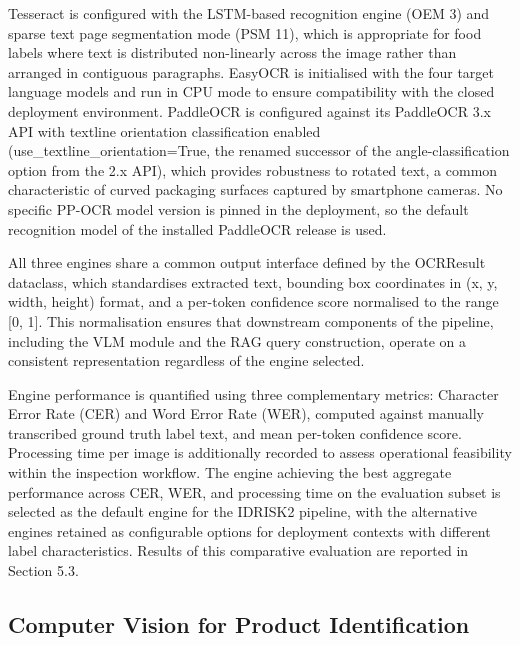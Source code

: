 Tesseract is configured with the LSTM-based recognition engine (OEM 3) and sparse text page segmentation mode (PSM 11), which is appropriate for food labels where text is distributed non-linearly across the image rather than arranged in contiguous paragraphs. EasyOCR is initialised with the four target language models and run in CPU mode to ensure compatibility with the closed deployment environment. PaddleOCR is configured against its PaddleOCR 3.x API with textline orientation classification enabled (use\_textline\_orientation=True, the renamed successor of the angle-classification option from the 2.x API), which provides robustness to rotated text, a common characteristic of curved packaging surfaces captured by smartphone cameras. No specific PP-OCR model version is pinned in the deployment, so the default recognition model of the installed PaddleOCR release is used.

All three engines share a common output interface defined by the OCRResult dataclass, which standardises extracted text, bounding box coordinates in (x, y, width, height) format, and a per-token confidence score normalised to the range {[}0, 1{]}. This normalisation ensures that downstream components of the pipeline, including the VLM module and the RAG query construction, operate on a consistent representation regardless of the engine selected.

Engine performance is quantified using three complementary metrics: Character Error Rate (CER) and Word Error Rate (WER), computed against manually transcribed ground truth label text, and mean per-token confidence score. Processing time per image is additionally recorded to assess operational feasibility within the inspection workflow. The engine achieving the best aggregate performance across CER, WER, and processing time on the evaluation subset is selected as the default engine for the IDRISK2 pipeline, with the alternative engines retained as configurable options for deployment contexts with different label characteristics. Results of this comparative evaluation are reported in Section 5.3.

\hypertarget{computer-vision-for-product-identification}{%
\subsection{Computer Vision for Product Identification}\label{computer-vision-for-product-identification}}

